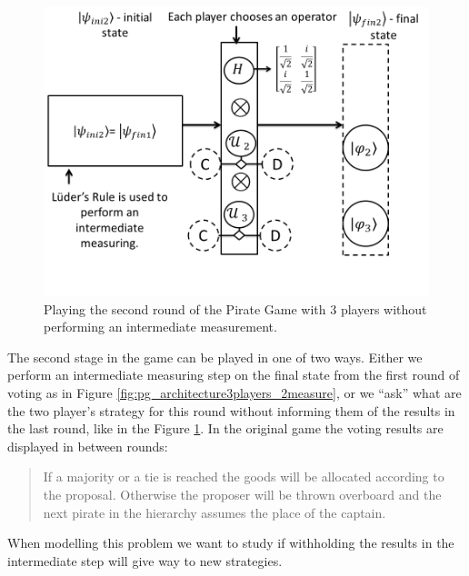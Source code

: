 \begin{figure}[h]
\centering 
\includegraphics[scale=0.35]{Figures/architecture/esquema/Slide3.png}
\caption{Playing the second round of the Pirate Game with 3 players without performing an intermediate measurement. }
\label{fig:pg_architecture3players_2nomeasure}
\end{figure}

The second stage in the game can be played in one of two ways. Either we perform an intermediate measuring step on the final state from the first round of voting as in Figure \ref{fig:pg_architecture3players_2measure}, or we ``ask'' what are the two player's strategy for this round without informing them of the results in the last round, like in the Figure \ref{fig:pg_architecture3players_2nomeasure}. In the original game the voting results are displayed in between rounds:

\begin{quotation}
If a majority or a tie is reached the goods will be allocated according to the proposal. Otherwise the proposer will be thrown overboard and the next pirate in the hierarchy assumes the place of the captain. 
\end{quotation}

When modelling this problem we want to study if withholding the results in the intermediate step will give way to new strategies.

